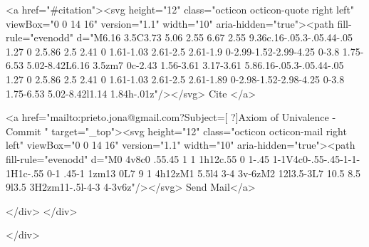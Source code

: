       <a  href="#citation"><svg height="12" class="octicon octicon-quote right left" viewBox="0 0 14 16" version="1.1" width="10" aria-hidden="true"><path fill-rule="evenodd" d="M6.16 3.5C3.73 5.06 2.55 6.67 2.55 9.36c.16-.05.3-.05.44-.05 1.27 0 2.5.86 2.5 2.41 0 1.61-1.03 2.61-2.5 2.61-1.9 0-2.99-1.52-2.99-4.25 0-3.8 1.75-6.53 5.02-8.42L6.16 3.5zm7 0c-2.43 1.56-3.61 3.17-3.61 5.86.16-.05.3-.05.44-.05 1.27 0 2.5.86 2.5 2.41 0 1.61-1.03 2.61-2.5 2.61-1.89 0-2.98-1.52-2.98-4.25 0-3.8 1.75-6.53 5.02-8.42l1.14 1.84h-.01z"/></svg> Cite
      </a>

      <a href="mailto:prieto.jona@gmail.com?Subject=[ ?]Axiom of Univalence - Commit " target="_top"><svg height="12" class="octicon octicon-mail right left" viewBox="0 0 14 16" version="1.1" width="10" aria-hidden="true"><path fill-rule="evenodd" d="M0 4v8c0 .55.45 1 1 1h12c.55 0 1-.45 1-1V4c0-.55-.45-1-1-1H1c-.55 0-1 .45-1 1zm13 0L7 9 1 4h12zM1 5.5l4 3-4 3v-6zM2 12l3.5-3L7 10.5 8.5 9l3.5 3H2zm11-.5l-4-3 4-3v6z"/></svg> Send Mail</a>

    </div>
  </div>

</div>




